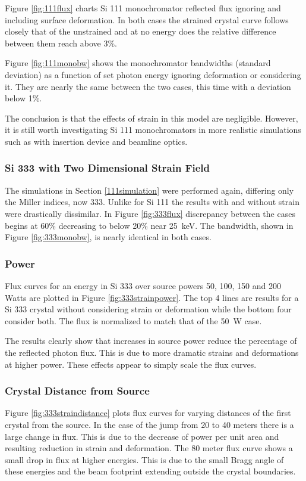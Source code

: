 \documentclass[preprint]{iucr}              %
\begin{document}
Figure \ref{fig:111flux} charts Si 111 monochromator reflected flux ignoring and including surface deformation. In both cases the strained crystal curve follows closely that of the unstrained and at no energy does the relative difference between them reach above 3\%.

Figure \ref{fig:111monobw} shows the monochromator bandwidths (standard deviation) as a function of set photon energy ignoring deformation or considering it. They are nearly the same between the two cases, this time with a deviation below 1\%.

The conclusion is that the effects of strain in this model are negligible. However, it is still worth investigating Si 111 monochromators in more realistic simulations such as with insertion device and beamline optics.



\subsubsection{Si 333 with Two Dimensional Strain Field}

The simulations in Section \ref{111simulation} were performed again, differing only the Miller indices, now 333. Unlike for Si 111 the results with and without strain were drastically dissimilar. In Figure \ref{fig:333flux} discrepancy between the cases begins at 60\% decreasing to below 20\% near 25~keV. The bandwidth, shown in Figure \ref{fig:333monobw}, is nearly identical in both cases.


\subsubsection{Power}
Flux curves for an energy in Si 333 over source powers 50, 100, 150 and 200 Watts are plotted in Figure \ref{fig:333strainpower}. The top 4 lines are results for a Si 333 crystal without considering strain or deformation while the bottom four consider both. The flux is normalized to match that of the 50~W case.

The results clearly show that increases in source power reduce the percentage of the reflected photon flux. This is due to more dramatic strains and deformations at higher power. These effects appear to simply scale the flux curves.

\subsubsection{Crystal Distance from Source}
Figure \ref{fig:333straindistance} plots flux curves for varying distances of the first crystal from the source. In the case of the jump from 20 to 40 meters there is a large change in flux. This is due to the decrease of power per unit area and resulting reduction in strain and deformation. The 80 meter flux curve shows a small drop in flux at higher energies. This is due to the small Bragg angle of these energies and the beam footprint extending outside the crystal boundaries.
\end{document}
